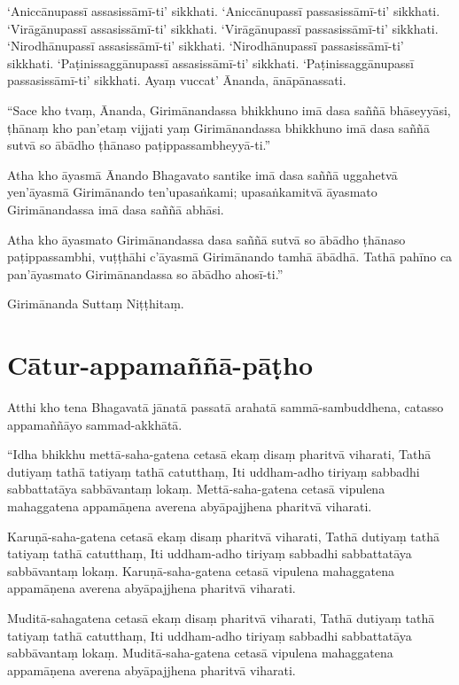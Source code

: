 ‘Aniccānupassī assasissāmī-ti’ sikkhati. ‘Aniccānupassī passasissāmī-ti’
sikkhati. ‘Virāgānupassī assasissāmī-ti’ sikkhati. ‘Virāgānupassī
passasissāmī-ti’ sikkhati. ‘Nirodhānupassī assasissāmī-ti’ sikkhati.
‘Nirodhānupassī passasissāmī-ti’ sikkhati. ‘Paṭinissaggānupassī assasissāmī-ti’
sikkhati. ‘Paṭinissaggānupassī passasissāmī-ti’ sikkhati. Ayaṃ vuccat’ Ānanda,
ānāpānassati.

“Sace kho tvaṃ, Ānanda, Girimānandassa bhikkhuno imā dasa saññā bhāseyyāsi,
ṭhānaṃ kho pan’etaṃ vijjati yaṃ Girimānandassa bhikkhuno imā dasa saññā sutvā so
ābādho ṭhānaso paṭippassambheyyā-ti.”

Atha kho āyasmā Ānando Bhagavato santike imā dasa saññā uggahetvā yen’āyasmā
Girimānando ten’upasaṅkami; upasaṅkamitvā āyasmato Girimānandassa imā dasa saññā
abhāsi.

Atha kho āyasmato Girimānandassa dasa saññā sutvā so ābādho ṭhānaso
paṭippassambhi, vuṭṭhāhi c’āyasmā Girimānando tamhā ābādhā. Tathā pahīno ca
pan’āyasmato Girimānandassa so ābādho ahosī-ti.”

Girimānanda Suttaṃ Niṭṭhitaṃ.


\section{Cātur-appamaññā-pāṭho}


Atthi kho tena Bhagavatā jānatā passatā arahatā sammā-sambuddhena, catasso
appamaññāyo sammad-akkhātā.

“Idha bhikkhu mettā-saha-gatena cetasā ekaṃ disaṃ pharitvā viharati, Tathā
dutiyaṃ tathā tatiyaṃ tathā catutthaṃ, Iti uddham-adho tiriyaṃ sabbadhi
sabbattatāya sabbāvantaṃ lokaṃ. Mettā-saha-gatena cetasā vipulena mahaggatena
appamāṇena averena abyāpajjhena pharitvā viharati.

Karuṇā-saha-gatena cetasā ekaṃ disaṃ pharitvā viharati, Tathā dutiyaṃ tathā
tatiyaṃ tathā catutthaṃ, Iti uddham-adho tiriyaṃ sabbadhi sabbattatāya
sabbāvantaṃ lokaṃ. Karuṇā-saha-gatena cetasā vipulena mahaggatena appamāṇena
averena abyāpajjhena pharitvā viharati.

Muditā-sahagatena cetasā ekaṃ disaṃ pharitvā viharati, Tathā dutiyaṃ tathā
tatiyaṃ tathā catutthaṃ, Iti uddham-adho tiriyaṃ sabbadhi sabbattatāya
sabbāvantaṃ lokaṃ. Muditā-saha-gatena cetasā vipulena mahaggatena appamāṇena
averena abyāpajjhena pharitvā viharati.

